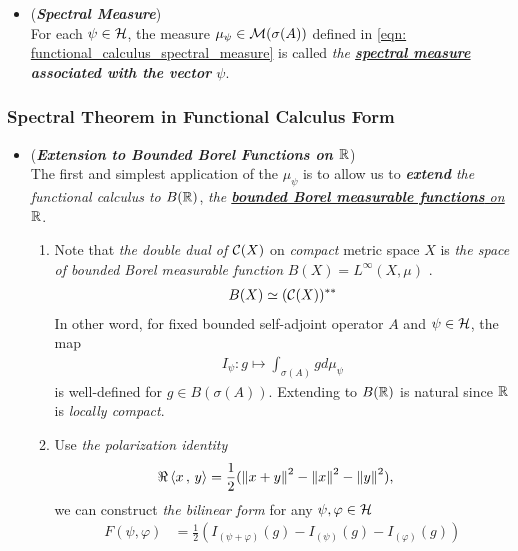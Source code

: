 \documentclass[11pt]{article}
\begin{document}
\begin{itemize}
\item 
\begin{definition} (\emph{\textbf{Spectral Measure}})\\
For each $\psi \in {\mathcal H}$, the measure $\mu_{\psi} \in {\mathcal M}(\sigma(A))$ defined in \eqref{eqn: functional_calculus_spectral_measure} is called \emph{the \underline{\textbf{spectral measure}} \textbf{associated with the vector} $\psi$}. 
\end{definition}
\end{itemize}

\subsubsection{Spectral Theorem in Functional Calculus Form}
\begin{itemize}
\item \begin{remark} (\emph{\textbf{Extension to Bounded Borel Functions on ${\mathbb R}$}}) \citep{reed1980methods}\\
The first and simplest application of the $\mu_{\psi}$ is to allow us to \emph{\textbf{extend} the functional calculus to $B({\mathbb R})$}, \emph{the \underline{\textbf{bounded Borel measurable functions} on ${\mathbb R}$}}. 
\begin{enumerate}
\item Note that \emph{the double dual of ${\mathcal C}(X)$} on \emph{compact} metric space $X$ is \emph{the space of bounded Borel measurable function} $B(X) = L^{\infty}(X, \mu)$ \citep{lax2002functional}.
\begin{align*}
B(X) \simeq ({\mathcal C}(X))^{**}
\end{align*}
In other word, for fixed bounded self-adjoint operator $A$ and $\psi \in {\mathcal H}$, the map 
\begin{align*}
I_{\psi}: g \mapsto \int_{\sigma(A)} g d\mu_{\psi} 
\end{align*} is well-defined for $g \in B(\sigma(A))$. Extending to $B({\mathbb R})$ is natural since ${\mathbb R}$ is \emph{locally compact}. 
\item Use  \emph{the polarization identity}
\begin{align*}
\Re \left\langle x\,,\, y \right\rangle &= \frac{1}{2}(\left\|x + y\right\|_{}^2 - \left\|x\right\|_{}^2 - \left\|y\right\|_{}^2),
\end{align*}
we can construct \emph{the bilinear form} for any $\psi, \varphi \in {\mathcal H}$
\begin{align*}
F(\psi, \varphi) &=\frac{1}{2} ( I_{(\psi+\varphi)}(g) - I_{(\psi)}(g) -  I_{(\varphi)}(g) )
\end{align*}

\end{enumerate}
\end{remark}
\end{itemize}
\end{document}
